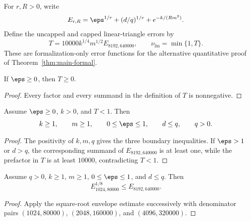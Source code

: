 \begin{definition}
\label{def:main-formal-linear-triangle-errors}
	\leanok
	For $r,R>0$, write
	\[
		E_{r,R}=\eps^{1/r}+(d/q)^{1/r}+e^{-k/(Rm^2)}.
	\]
	Define the uncapped and capped linear-triangle errors by
	\[
		T=10000k^{1/4}m^{1/2}E_{8192,640000},
		\qquad \nu_{\mathrm{lin}}=\min\{1,T\}.
	\]
	These are formalization-only error functions for the alternative quantitative
	proof of Theorem~\ref{thm:main-formal}.
\end{definition}

\begin{lemma}
\label{lem:main-formal-linear-triangle-error-nonnegative}
	\leanok
	If $\eps\ge0$, then $T\ge0$.
\end{lemma}
\begin{proof}
	\leanok
	Every factor and every summand in the definition of $T$ is nonnegative.
\end{proof}

\begin{lemma}
\label{lem:main-formal-linear-triangle-small-error-domain}
	\leanok
	Assume $\eps\ge0$, $k>0$, and $T<1$.  Then
	\[
		k\ge1,\qquad m\ge1,\qquad 0\le\eps\le1,
		\qquad d\le q,\qquad q>0.
	\]
\end{lemma}
\begin{proof}
	\leanok
	The positivity of $k,m,q$ gives the three boundary inequalities.  If
	$\eps>1$ or $d>q$, the corresponding summand of $E_{8192,640000}$ is at
	least one, while the prefactor in $T$ is at least $10000$, contradicting
	$T<1$.
\end{proof}

\begin{lemma}
\label{lem:main-formal-linear-triangle-envelope-eighth-root}
	\leanok
	Assume $q>0$, $k\ge1$, $m\ge1$, $0\le\eps\le1$, and $d\le q$.  Then
	\[
		E_{1024,80000}^{1/8}\le E_{8192,640000}.
	\]
\end{lemma}
\begin{proof}
	\leanok
	Apply the square-root envelope estimate successively with denominator pairs
	$(1024,80000)$, $(2048,160000)$, and $(4096,320000)$.
\end{proof}

